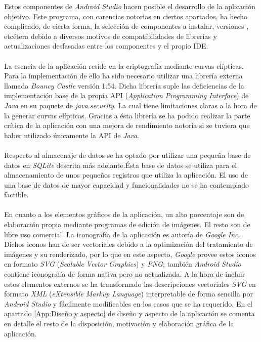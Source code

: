 \documentclass[../PFC.tex]{subfiles}
\begin{document}
Estos componentes de \textit{Android Studio} hacen posible el desarrollo de la aplicación objetivo. Este programa, con carencias notorias en ciertos apartados, ha hecho complicado, de cierta forma, la selección de componentes a instalar, versiones , etcétera debido a diversos motivos de compatibilidades de librerías y actualizaciones desfasadas entre los componentes y el propio IDE. 
\\\\
La esencia de la aplicación reside en la criptografía mediante curvas elípticas. Para la implementación de ello ha sido necesario utilizar una librería externa llamada \textit{Bouncy Castle}\cite{bouncyCastle} versión 1.54. Dicha librería suple las deficiencias de la implementación base de la propia API (\textit{Application Programming Interface}) de \textit{Java} en su paquete de \textit{java.security}\cite{javaSecurity}. La cual tiene limitaciones claras a la hora de la generar curvas elípticas. Gracias a ésta librería se ha podido realizar la parte crítica de la aplicación con una mejora de rendimiento notoria si se tuviera que haber utilizado únicamente la API de \textit{Java}. 
\\\\
Respecto al almacenaje de datos se ha optado por utilizar una pequeña base de datos en \textit{SQLite}\cite{sqlite} descrita más adelante.Ésta base de datos se utiliza para el almacenamiento de unos pequeños registros que utiliza la aplicación. El uso de una base de datos de mayor capacidad y funcionalidades no se ha contemplado factible. 
\\\\
En cuanto a los elementos gráficos de la aplicación, un alto porcentaje son de elaboración propia mediante programas de edición de imágenes. El resto son de libre uso comercial. La iconografía de la aplicación es autoría de \textit{Google Inc.}\cite{googleIcons}. Dichos iconos han de ser vectoriales debido a la optimización del tratamiento de imágenes y su renderizado, por lo que en este aspecto, \textit{Google} provee estos  iconos en formato \textit{SVG} (\textit{Scalable Vector Graphics}) y \textit{PNG}; también \textit{Android Studio} contiene iconografía de forma nativa pero no actualizada. A la hora de incluir estos elementos externos se ha transformado las descripciones vectoriales \textit{SVG} en formato \textit{XML} (\textit{eXtensible Markup Language}) interpretable de forma sencilla por \textit{Android Studio} y fácilmente modificables en los casos que se ha requerido. En el apartado \ref{App:Diseño y aspecto} de diseño y aspecto de la aplicación se comenta en detalle el resto de la disposición, motivación y elaboración gráfica de la aplicación. 
\end{document}
